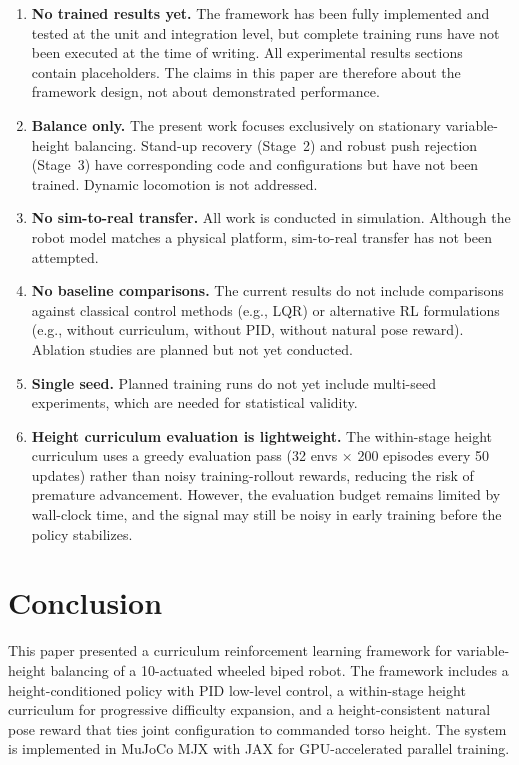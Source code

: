 \documentclass[conference]{IEEEtran}
\begin{document}
\begin{enumerate}
    \item \textbf{No trained results yet.} The framework has been fully implemented and tested at the unit and integration level, but complete training runs have not been executed at the time of writing. All experimental results sections contain placeholders. The claims in this paper are therefore about the framework design, not about demonstrated performance.

    \item \textbf{Balance only.} The present work focuses exclusively on stationary variable-height balancing. Stand-up recovery (Stage~2) and robust push rejection (Stage~3) have corresponding code and configurations but have not been trained. Dynamic locomotion is not addressed.

    \item \textbf{No sim-to-real transfer.} All work is conducted in simulation. Although the robot model matches a physical platform, sim-to-real transfer has not been attempted.

    \item \textbf{No baseline comparisons.} The current results do not include comparisons against classical control methods (e.g., LQR) or alternative RL formulations (e.g., without curriculum, without PID, without natural pose reward). Ablation studies are planned but not yet conducted.

    \item \textbf{Single seed.} Planned training runs do not yet include multi-seed experiments, which are needed for statistical validity.

    \item \textbf{Height curriculum evaluation is lightweight.} The within-stage height curriculum uses a greedy evaluation pass (32 envs × 200 episodes every 50 updates) rather than noisy training-rollout rewards, reducing the risk of premature advancement. However, the evaluation budget remains limited by wall-clock time, and the signal may still be noisy in early training before the policy stabilizes.
\end{enumerate}

\section{Conclusion}
This paper presented a curriculum reinforcement learning framework for variable-height balancing of a 10-actuated wheeled biped robot. The framework includes a height-conditioned policy with PID low-level control, a within-stage height curriculum for progressive difficulty expansion, and a height-consistent natural pose reward that ties joint configuration to commanded torso height. The system is implemented in MuJoCo MJX with JAX for GPU-accelerated parallel training.
\end{document}
